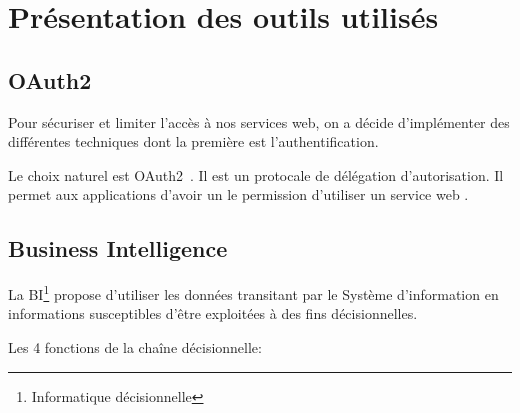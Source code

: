 \section{Présentation des outils utilisés}

\subsection{OAuth2}

Pour sécuriser et limiter l'accès à nos services web, on a décide d'implémenter des différentes techniques dont la première est l'authentification.

Le choix naturel est OAuth2~\cite{RFC6749}. Il est un protocale de délégation
d'autorisation. Il permet aux applications  d'avoir un
le permission d'utiliser un service web .



\subsection{Business Intelligence}

La \acrfull{BI}\footnote{Informatique décisionnelle} propose d'utiliser les
données transitant par le Système d'information en informations susceptibles
d'être exploitées à des fins décisionnelles.


Les 4 fonctions de la chaîne décisionnelle:


